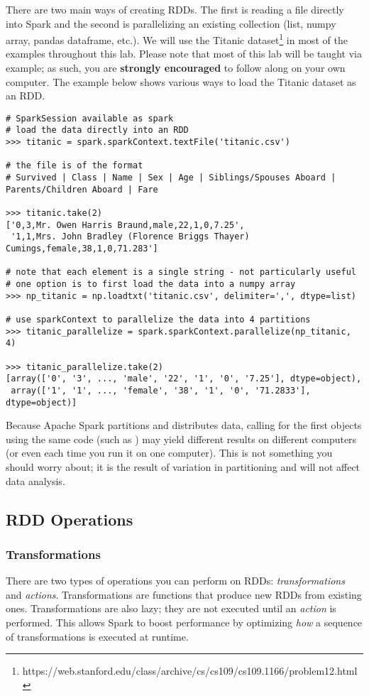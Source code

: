 There are two main ways of creating RDDs. The first is reading a file directly into Spark and the second is parallelizing an existing collection (list, numpy array, pandas dataframe, etc.). We will use the Titanic dataset\footnote{https://web.stanford.edu/class/archive/cs/cs109/cs109.1166/problem12.html} in most of the examples throughout this lab. Please note that most of this lab will be taught via example; as such, you are \textbf{strongly encouraged} to follow along on your own computer.  The example below shows various ways to load the Titanic dataset as an RDD.

\begin{lstlisting}
# SparkSession available as spark
# load the data directly into an RDD
>>> titanic = spark.sparkContext.textFile('titanic.csv')

# the file is of the format
# Survived | Class | Name | Sex | Age | Siblings/Spouses Aboard | Parents/Children Aboard | Fare

>>> titanic.take(2)
['0,3,Mr. Owen Harris Braund,male,22,1,0,7.25',
 '1,1,Mrs. John Bradley (Florence Briggs Thayer) Cumings,female,38,1,0,71.283']

# note that each element is a single string - not particularly useful
# one option is to first load the data into a numpy array
>>> np_titanic = np.loadtxt('titanic.csv', delimiter=',', dtype=list)

# use sparkContext to parallelize the data into 4 partitions
>>> titanic_parallelize = spark.sparkContext.parallelize(np_titanic, 4)

>>> titanic_parallelize.take(2)
[array(['0', '3', ..., 'male', '22', '1', '0', '7.25'], dtype=object),
 array(['1', '1', ..., 'female', '38', '1', '0', '71.2833'], dtype=object)]
\end{lstlisting}

\begin{warn}
Because Apache Spark partitions and distributes data, calling for the first  objects using the same code (such as ) may yield different results on different computers (or even each time you run it on one computer). This is not something you should worry about; it is the result of variation in partitioning and will not affect data analysis.
\end{warn}

\subsection*{RDD Operations}
\subsubsection*{Transformations}
There are two types of operations you can perform on RDDs: \textit{transformations} and \textit{actions}. 
Transformations are functions that produce new RDDs from existing ones. 
Transformations are also lazy; they are not executed until an \textit{action} is performed.
This allows Spark to boost performance by optimizing \textit{how} a sequence of transformations is executed at runtime.

